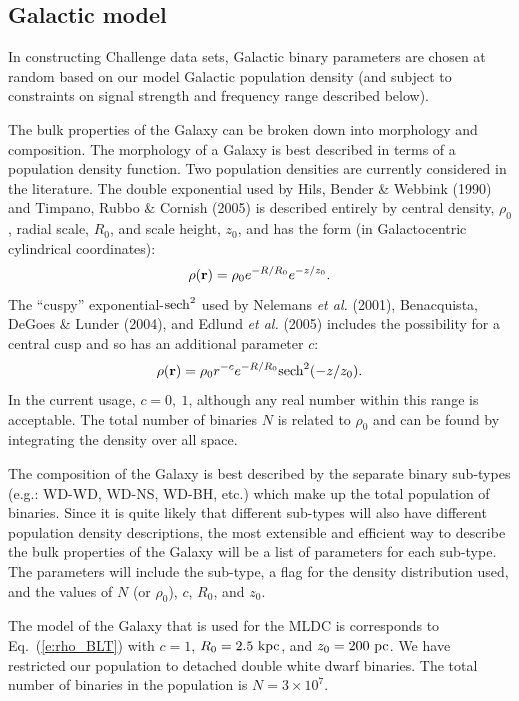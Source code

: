 \documentclass[11pt]{report}
\def\be{\begin{equation}}
\def\ee{\end{equation}}
\begin{document}

\subsection{Galactic model}
In constructing Challenge data sets, Galactic binary parameters are
chosen at random based on our model Galactic population density (and
subject to constraints on signal strength and frequency range
described below). 

The bulk properties of the Galaxy can be broken down into morphology and composition. The morphology of a Galaxy is best described in terms of a population density function. Two population densities are currently considered in the literature. The double exponential used by Hils, Bender \& Webbink (1990) and Timpano, Rubbo \& Cornish (2005) is described entirely by central density, $\rho_0$, radial scale, $R_0$, and scale height, $z_0$, and has the form (in Galactocentric cylindrical coordinates):
\begin{equation}
\rho({\bf r}) = \rho_0 e^{-R/R_0} e^{-z/z_0}. 
\end{equation}
The ``cuspy'' exponential-${\rm sech}^2$ used by Nelemans {\it et al.} (2001), Benacquista, DeGoes \& Lunder (2004), and Edlund {\it et al.} (2005) includes the possibility for a central cusp and so has an additional parameter $c$:
\be
\rho({\bf r}) = \rho_0 r^{-c} e^{-R/R_0} {\rm sech}^2(-z/z_0).
\label{e:rho_BLT}
\ee
In the current usage, $c = 0,~1$, although any real number within this range is acceptable. The total number of binaries $N$ is related to $\rho_0$ and can be found by integrating the density over all space.

The composition of the Galaxy is best described by the separate binary sub-types (e.g.: WD-WD, WD-NS, WD-BH, etc.) which make up the total population of binaries. Since it is quite likely that different sub-types will also have different population density descriptions, the most extensible and efficient way to describe the bulk properties of the Galaxy will be a list of parameters for each sub-type. The parameters will include the sub-type, a flag for the density distribution used, and the values of $N$ (or $\rho_0$), $c$, $R_0$, and $z_0$.

The model of the Galaxy that is used for the MLDC is corresponds to Eq.~(\ref{e:rho_BLT}) with $c = 1$, $R_0 = 2.5~{\rm  kpc}$, and $z_0 = 200~{\rm pc}$. We have restricted  our population to detached double white dwarf binaries. The total number of binaries in the  
population is $N = 3 \times 10^7$.
\end{document}
